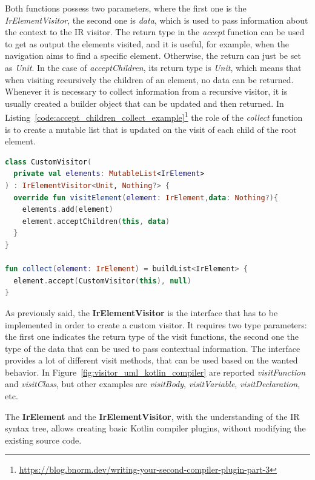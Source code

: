 Both functions possess two parameters, where the first one is the \textit{IrElementVisitor}, the second one is \textit{data}, which is used to pass information about the context to the IR visitor.\newline
The return type in the \textit{accept} function can be used to get as output the elements visited, and it is useful, for example, when the navigation aims to find a specific element. Otherwise, the return can just be set as \textit{Unit}.\newline
In the case of \textit{acceptChildren}, its return type is \textit{Unit}, which means that when visiting recursively the children of an element, no data can be returned. Whenever it is necessary to collect information from a recursive visitor, it is usually created a builder object that can be updated and then returned. In Listing~\ref{code:accept_children_collect_example}\footnote{\url{https://blog.bnorm.dev/writing-your-second-compiler-plugin-part-3}} the role of the \textit{collect} function is to create a mutable list that is updated on the visit of each child of the root element.
\begin{lstlisting}[caption={Example of a custom visitor and a function that supports the collection of elements}, captionpos=b, language=Kotlin, label={code:accept_children_collect_example}]
class CustomVisitor(
  private val elements: MutableList<IrElement>
) : IrElementVisitor<Unit, Nothing?> {
  override fun visitElement(element: IrElement,data: Nothing?){
    elements.add(element)
    element.acceptChildren(this, data)
  }
}

fun collect(element: IrElement) = buildList<IrElement> {
  element.accept(CustomVisitor(this), null)
}
\end{lstlisting}

As previously said, the \textbf{IrElementVisitor} is the interface that has to be implemented in order to create a custom visitor. It requires two type parameters: the first one indicates the return type of the visit functions, the second one the type of the data that can be used to pass contextual information. The interface provides a lot of different visit methods, that can be used based on the wanted behavior. In Figure~\ref{fig:visitor_uml_kotlin_compiler} are reported \textit{visitFunction} and \textit{visitClass}, but other examples are \textit{visitBody}, \textit{visitVariable}, \textit{visitDeclaration}, etc.

The \textbf{IrElement} and the \textbf{IrElementVisitor}, with the understanding of the IR syntax tree, allows creating basic Kotlin compiler plugins, without modifying the existing source code.

